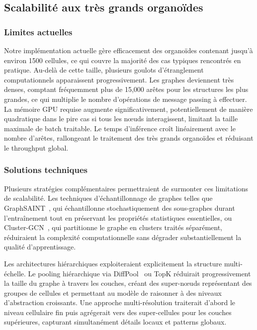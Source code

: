 \subsection{Scalabilité aux très grands organoïdes}

\subsubsection{Limites actuelles}

Notre implémentation actuelle gère efficacement des organoïdes contenant jusqu'à environ 1500 cellules, ce qui couvre la majorité des cas typiques rencontrés en pratique. Au-delà de cette taille, plusieurs goulots d'étranglement computationnels apparaissent progressivement. Les graphes deviennent très denses, comptant fréquemment plus de 15,000 arêtes pour les structures les plus grandes, ce qui multiplie le nombre d'opérations de message passing à effectuer. La mémoire GPU requise augmente significativement, potentiellement de manière quadratique dans le pire cas si tous les nœuds interagissent, limitant la taille maximale de batch traitable. Le temps d'inférence croît linéairement avec le nombre d'arêtes, rallongeant le traitement des très grands organoïdes et réduisant le throughput global.

\subsubsection{Solutions techniques}

Plusieurs stratégies complémentaires permettraient de surmonter ces limitations de scalabilité. Les techniques d'échantillonnage de graphes telles que GraphSAINT~\cite{Zeng2020}, qui échantillonne stochastiquement des sous-graphes durant l'entraînement tout en préservant les propriétés statistiques essentielles, ou Cluster-GCN~\cite{Chiang2019}, qui partitionne le graphe en clusters traités séparément, réduiraient la complexité computationnelle sans dégrader substantiellement la qualité d'apprentissage.

Les architectures hiérarchiques exploiteraient explicitement la structure multi-échelle. Le pooling hiérarchique via DiffPool~\cite{Ying2018} ou TopK réduirait progressivement la taille du graphe à travers les couches, créant des super-nœuds représentant des groupes de cellules et permettant au modèle de raisonner à des niveaux d'abstraction croissants. Une approche multi-résolution traiterait d'abord le niveau cellulaire fin puis agrégerait vers des super-cellules pour les couches supérieures, capturant simultanément détails locaux et patterns globaux.

